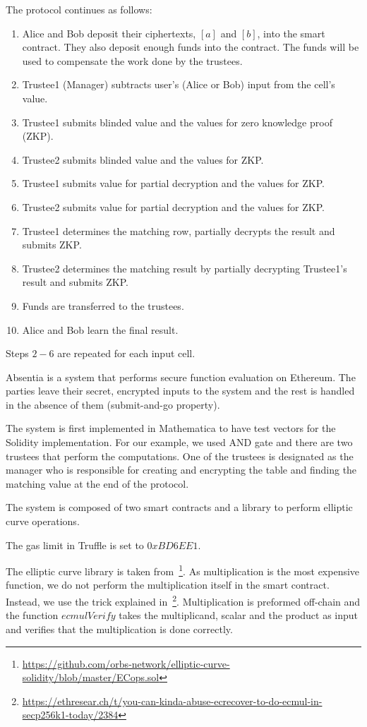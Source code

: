 \begin{mdframed}
 	The protocol continues as follows:
 	\begin{enumerate}
 		\item Alice and Bob deposit their ciphertexts, $[a]$ and $[b]$, into the smart contract. They also deposit enough funds into the contract. The funds will be used to compensate the work done by the trustees.
 		\item Trustee1 (Manager) subtracts user's (Alice or Bob) input from the cell's value.
 		\item Trustee1 submits blinded value and the values for zero knowledge proof (ZKP).
 		\item Trustee2 submits blinded value and the values for ZKP.
 		\item Trustee1 submits value for partial decryption and the values for ZKP.
 		\item Trustee2 submits value for partial decryption and the values for ZKP.
 		\item Trustee1 determines the matching row, partially decrypts the result and submits ZKP.
 		\item Trustee2  determines the matching result by partially decrypting Trustee1's result and submits ZKP.
 		\item Funds are transferred to the trustees.
 		\item Alice and Bob learn the final result.
 	\end{enumerate}
\end{mdframed}

Steps $2-6$ are repeated for each input cell.

Absentia is a system that performs secure function evaluation on Ethereum. The parties leave their secret, encrypted inputs to the system and the rest is handled in the absence of them (submit-and-go property).

The system is first implemented in Mathematica to have test vectors for the Solidity implementation. For our example, we used AND gate and there are two trustees that perform the computations. One of the trustees is designated as the manager who is responsible for creating and encrypting the table and finding the matching value at the end of the protocol.

The system is composed of two smart contracts and a library to perform elliptic curve operations.

The gas limit in Truffle is set to $0xBD6EE1$.

The elliptic curve library is taken from~\footnote{\url{https://github.com/orbs-network/elliptic-curve-solidity/blob/master/ECops.sol}}. As multiplication is the most expensive function, we do not perform the multiplication itself in the smart contract. Instead, we use the trick explained in~\footnote{\url{https://ethresear.ch/t/you-can-kinda-abuse-ecrecover-to-do-ecmul-in-secp256k1-today/2384}}. Multiplication is preformed off-chain and the function $ecmulVerify$ takes the multiplicand, scalar and the product as input and verifies that the multiplication is done correctly.

